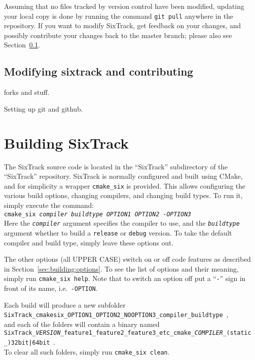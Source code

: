 \documentclass[english]{article}
\begin{document}
Assuming that no files tracked by version control have been modified, updating your local copy is done by running the command
\texttt{git pull} anywhere in the repository.
If you want to modify SixTrack, get feedback on your changes, and possibly contribute your changes back to the master branch; please also see Section~\ref{sec:downloading:contributing}.

\subsection{Modifying sixtrack and contributing}
\label{sec:downloading:contributing}


forks and stuff.

Setting up git and github.


\section{Building SixTrack}
\label{sec:building}

The SixTrack source code is located in the ``SixTrack'' subdirectory of the ``SixTrack'' repository.
SixTrack is normally configured and built using CMake, and for simplicity a wrapper \texttt{cmake\_six} is provided.
This allows configuring the various build options, changing compilers, and changing build types.
To run it, simply execute the command:\\
\texttt{cmake\_six \textit{compiler} \textit{buildtype} \textit{OPTION1} \textit{OPTION2} \textit{-OPTION3}}\\
Here the \texttt{\textit{compiler}} argument specifies the compiler to use, and the \texttt{\textit{buildtype}} argument whether to build a \texttt{release} or \texttt{debug} version.
To take the default compiler and build type, simply leave these options out.

The other options (all UPPER CASE) switch on or off code features as described in Section~\ref{sec:building:options}.
To see the list of options and their meaning, simply run \texttt{cmake\_six help}.
Note that to switch an option off put a ``\texttt{-}'' sign in front of its name, i.e.\ \texttt{-OPTION}.

Each build will produce a new subfolder\\
{
  \texttt{SixTrack\_\-cmakesix\_\-OPTION1\_\-OPTION2\_\-NOOPTION3\_\-compiler\_\-buildtype}~,\\
}
and each of the folders will contain a binary named\\
{\scriptsize
  \texttt{SixTrack\_\textit{VERSION}\_feature1\_feature2\_feature3\_etc\_cmake\_\textit{COMPILER}\_(static\_){32bit|64bit}}~.\\
}
To clear all such folders, simply run \texttt{cmake\_six clean}.
\end{document}
